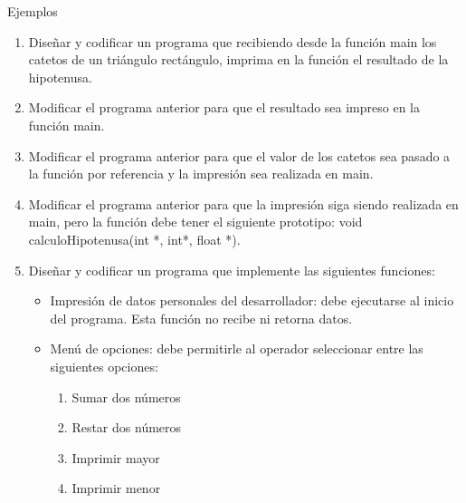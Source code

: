 \documentclass[xcolor=pdftex,table,11pt]{beamer}
\begin{document}
\begin{frame}[allowframebreaks]{Ejemplos}
 \begin{enumerate}
   
     \item Diseñar y codificar un programa que recibiendo desde la función main los catetos de un triángulo rectángulo, imprima en la función el resultado de la hipotenusa. \\
\href{https://github.com/danis963/informaticaI_IUA/blob/main/c/src/7-funcion_triangulo.c}{}

\item Modificar el programa anterior para que el resultado sea impreso en la función main.\\
\href{https://github.com/danis963/informaticaI_IUA/blob/main/c/src/7-funcion_triangulo_return.c}{}



\item Modificar el programa anterior para que el valor de los catetos sea pasado a la función por referencia y la impresión sea realizada en main.
\href{https://github.com/danis963/informaticaI_IUA/blob/main/c/src/7-funcion_triangulo_referencia.c}{}


\item Modificar el programa anterior para que la impresión siga siendo realizada en main, pero la función debe tener el siguiente prototipo: void calculoHipotenusa(int *, int*, float *). 
\href{https://github.com/danis963/informaticaI_IUA/blob/main/c/src/7-funcion_triangulo_referenciafull.c}{}


\newpage
     \item Diseñar y codificar un programa que implemente las siguientes funciones:
     \begin{itemize}
     \item Impresión de datos personales del desarrollador: debe ejecutarse al inicio del programa. Esta función no recibe ni retorna datos.
      \item Menú de opciones: debe permitirle al operador seleccionar entre las siguientes opciones:
      \begin{enumerate}
      
            \item Sumar dos números
            \item Restar dos números
            \item Imprimir mayor
            \item Imprimir menor
        

\end{enumerate}
\end{itemize}
\end{enumerate}
\end{frame}
\end{document}
